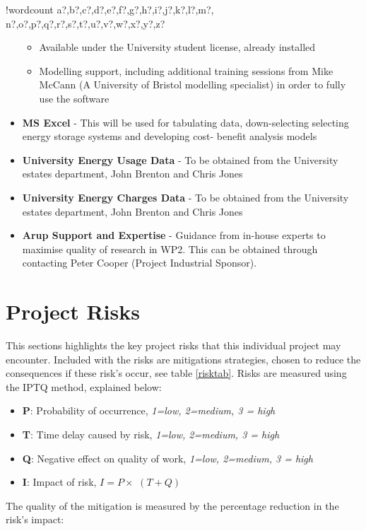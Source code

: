 \documentclass[10pt]{article}
\providecommand{\tightlist}{%
  \setlength{\itemsep}{0pt}\setlength{\parskip}{0pt}}
\newcounter{words}
\newenvironment{counted}{%
  \setcounter{words}{0}
  \SearchList!{wordcount}{\stepcounter{words}}
    {a?,b?,c?,d?,e?,f?,g?,h?,i?,j?,k?,l?,m?,
    n?,o?,p?,q?,r?,s?,t?,u?,v?,w?,x?,y?,z?}
  \UndoBoundary{'}
  \SearchOrder{p;}}{%
  \StopSearching}
\begin{document}
\begin{counted}
\begin{itemize}
  \begin{itemize}
  \tightlist
  \item
    Available under the University student license, already installed
  \item
    Modelling support, including additional training sessions from Mike
    McCann (A University of Bristol modelling specialist) in order to
    fully use the software
  \end{itemize}
\item
  \textbf{MS Excel} - This will be used for tabulating data,
  down-selecting selecting energy storage systems and developing cost-
  benefit analysis models
\item
  \textbf{University Energy Usage Data} - To be obtained from the
  University estates department, John Brenton and Chris Jones
\item
  \textbf{University Energy Charges Data} - To be obtained from the
  University estates department, John Brenton and Chris Jones
\item
  \textbf{Arup Support and Expertise} - Guidance from in-house experts
  to maximise quality of research in WP2. This can be obtained through
  contacting Peter Cooper (Project Industrial Sponsor).
\end{itemize}

\section{Project Risks}\label{project-risks}

This sections highlights the key project risks that this individual
project may encounter. Included with the risks are mitigations
strategies, chosen to reduce the consequences if these risk's occur, see
table \ref{risktab}. Risks are measured using the IPTQ method, explained
below:

\begin{itemize}
\tightlist
\item
  \textbf{P}: Probability of occurrence,
  \textit{1=low, 2=medium, 3 = high}
\item
  \textbf{T}: Time delay caused by risk,
  \textit{1=low, 2=medium, 3 = high}
\item
  \textbf{Q}: Negative effect on quality of work,
  \textit{1=low, 2=medium, 3 = high}
\item
  \textbf{I}: Impact of risk, \(I=P\times\) \((T+Q)\)
\end{itemize}

The quality of the mitigation is measured by the percentage reduction in
the risk's impact:


\end{counted}
\end{document}
